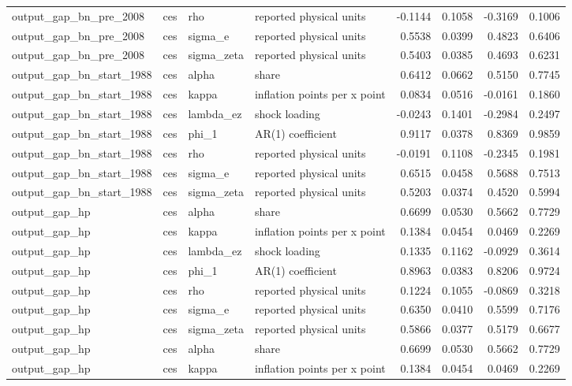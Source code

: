 \begin{tabular}{llllrrrr}
output\_gap\_bn\_pre\_2008 & ces & rho & reported physical units & -0.1144 & 0.1058 & -0.3169 & 0.1006 \\
output\_gap\_bn\_pre\_2008 & ces & sigma\_e & reported physical units & 0.5538 & 0.0399 & 0.4823 & 0.6406 \\
output\_gap\_bn\_pre\_2008 & ces & sigma\_zeta & reported physical units & 0.5403 & 0.0385 & 0.4693 & 0.6231 \\
output\_gap\_bn\_start\_1988 & ces & alpha & share & 0.6412 & 0.0662 & 0.5150 & 0.7745 \\
output\_gap\_bn\_start\_1988 & ces & kappa & inflation points per x point & 0.0834 & 0.0516 & -0.0161 & 0.1860 \\
output\_gap\_bn\_start\_1988 & ces & lambda\_ez & shock loading & -0.0243 & 0.1401 & -0.2984 & 0.2497 \\
output\_gap\_bn\_start\_1988 & ces & phi\_1 & AR(1) coefficient & 0.9117 & 0.0378 & 0.8369 & 0.9859 \\
output\_gap\_bn\_start\_1988 & ces & rho & reported physical units & -0.0191 & 0.1108 & -0.2345 & 0.1981 \\
output\_gap\_bn\_start\_1988 & ces & sigma\_e & reported physical units & 0.6515 & 0.0458 & 0.5688 & 0.7513 \\
output\_gap\_bn\_start\_1988 & ces & sigma\_zeta & reported physical units & 0.5203 & 0.0374 & 0.4520 & 0.5994 \\
output\_gap\_hp & ces & alpha & share & 0.6699 & 0.0530 & 0.5662 & 0.7729 \\
output\_gap\_hp & ces & kappa & inflation points per x point & 0.1384 & 0.0454 & 0.0469 & 0.2269 \\
output\_gap\_hp & ces & lambda\_ez & shock loading & 0.1335 & 0.1162 & -0.0929 & 0.3614 \\
output\_gap\_hp & ces & phi\_1 & AR(1) coefficient & 0.8963 & 0.0383 & 0.8206 & 0.9724 \\
output\_gap\_hp & ces & rho & reported physical units & 0.1224 & 0.1055 & -0.0869 & 0.3218 \\
output\_gap\_hp & ces & sigma\_e & reported physical units & 0.6350 & 0.0410 & 0.5599 & 0.7176 \\
output\_gap\_hp & ces & sigma\_zeta & reported physical units & 0.5866 & 0.0377 & 0.5179 & 0.6677 \\
output\_gap\_hp & ces & alpha & share & 0.6699 & 0.0530 & 0.5662 & 0.7729 \\
output\_gap\_hp & ces & kappa & inflation points per x point & 0.1384 & 0.0454 & 0.0469 & 0.2269 \\

\end{tabular}
